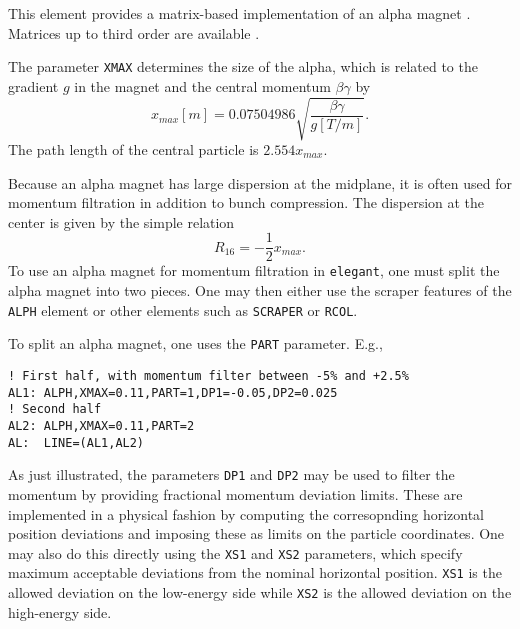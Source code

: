 This element provides a matrix-based implementation of an alpha magnet \cite{Enge}. 
Matrices up to third order are available \cite{Borland_thesis}.

The parameter {\tt XMAX} determines the size of the alpha, which is related
to the gradient $g$ in the magnet and the central momentum $\beta\gamma$ by
\begin{equation}
x_{max} [m] = 0.07504986 \sqrt{\frac{\beta\gamma}{g [T/m]}}.
\end{equation}
The path length of the central particle is $2.554 x_{max}$.

Because an alpha magnet has large dispersion at the midplane, it is often used
for momentum filtration in addition to bunch compression.  The dispersion at the
center is given by the simple relation 
\begin{equation}
R_{16} = -\frac{1}{2} x_{max}.
\end{equation}
To use an alpha magnet for momentum filtration in {\tt elegant}, one must split the
alpha magnet into two pieces.  One may then either use the scraper features of the
{\tt ALPH} element or other elements such as {\tt SCRAPER} or {\tt RCOL}.

To split an alpha magnet, one uses the {\tt PART} parameter.  E.g.,
\begin{verbatim}
! First half, with momentum filter between -5% and +2.5%
AL1: ALPH,XMAX=0.11,PART=1,DP1=-0.05,DP2=0.025
! Second half 
AL2: ALPH,XMAX=0.11,PART=2
AL:  LINE=(AL1,AL2)
\end{verbatim}

As just illustrated, the parameters {\tt DP1} and {\tt DP2} may be used to filter the
momentum by providing fractional momentum deviation limits.  These are implemented in
a physical fashion by computing the corresopnding horizontal position deviations and
imposing these as limits on the particle coordinates.  One may also do this directly
using the {\tt XS1} and {\tt XS2} parameters, which specify maximum acceptable deviations
from the nominal horizontal position.  {\tt XS1} is the allowed deviation on the low-energy
side while {\tt XS2} is the allowed deviation on the high-energy side.
